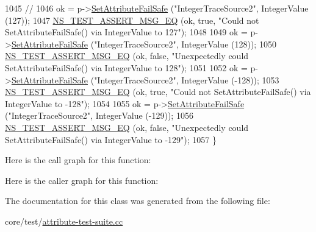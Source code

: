 \begin{DoxyCode}
1045   \textcolor{comment}{//}
1046   ok = p->\hyperlink{classns3_1_1ObjectBase_aa7d333004e970f925a4ed5df275541b5}{SetAttributeFailSafe} (\textcolor{stringliteral}{"IntegerTraceSource2"}, IntegerValue (127));
1047   \hyperlink{group__testing_ga2a9d78cffb3db8e867c35fff0b698cf5}{NS\_TEST\_ASSERT\_MSG\_EQ} (ok, \textcolor{keyword}{true}, \textcolor{stringliteral}{"Could not SetAttributeFailSafe() via IntegerValue
       to 127"});
1048 
1049   ok = p->\hyperlink{classns3_1_1ObjectBase_aa7d333004e970f925a4ed5df275541b5}{SetAttributeFailSafe} (\textcolor{stringliteral}{"IntegerTraceSource2"}, IntegerValue (128));
1050   \hyperlink{group__testing_ga2a9d78cffb3db8e867c35fff0b698cf5}{NS\_TEST\_ASSERT\_MSG\_EQ} (ok, \textcolor{keyword}{false}, \textcolor{stringliteral}{"Unexpectedly could SetAttributeFailSafe() via
       IntegerValue to 128"});
1051 
1052   ok = p->\hyperlink{classns3_1_1ObjectBase_aa7d333004e970f925a4ed5df275541b5}{SetAttributeFailSafe} (\textcolor{stringliteral}{"IntegerTraceSource2"}, IntegerValue (-128));
1053   \hyperlink{group__testing_ga2a9d78cffb3db8e867c35fff0b698cf5}{NS\_TEST\_ASSERT\_MSG\_EQ} (ok, \textcolor{keyword}{true}, \textcolor{stringliteral}{"Could not SetAttributeFailSafe() via IntegerValue
       to -128"});
1054 
1055   ok = p->\hyperlink{classns3_1_1ObjectBase_aa7d333004e970f925a4ed5df275541b5}{SetAttributeFailSafe} (\textcolor{stringliteral}{"IntegerTraceSource2"}, IntegerValue (-129));
1056   \hyperlink{group__testing_ga2a9d78cffb3db8e867c35fff0b698cf5}{NS\_TEST\_ASSERT\_MSG\_EQ} (ok, \textcolor{keyword}{false}, \textcolor{stringliteral}{"Unexpectedly could SetAttributeFailSafe() via
       IntegerValue to -129"});
1057 \}
\end{DoxyCode}


Here is the call graph for this function\+:




Here is the caller graph for this function\+:




The documentation for this class was generated from the following file\+:\begin{DoxyCompactItemize}
\item 
core/test/\hyperlink{attribute-test-suite_8cc}{attribute-\/test-\/suite.\+cc}\end{DoxyCompactItemize}
